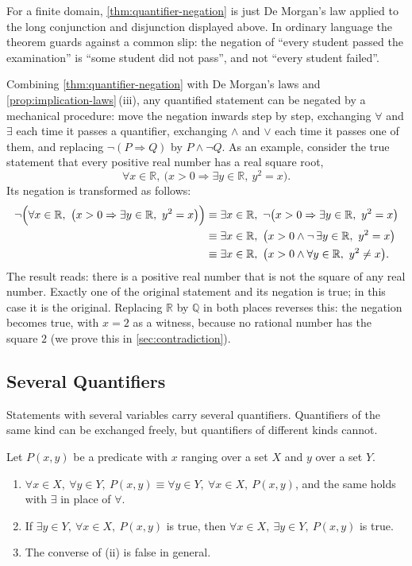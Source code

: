 For a finite domain, \cref{thm:quantifier-negation} is just De Morgan's law applied to the long conjunction and disjunction displayed above. In ordinary language the theorem guards against a common slip: the negation of ``every student passed the examination'' is ``some student did not pass'', and not ``every student failed''.

Combining \cref{thm:quantifier-negation} with De Morgan's laws and \cref{prop:implication-laws}\,(iii), any quantified statement can be negated by a mechanical procedure: move the negation inwards step by step, exchanging $\forall$ and $\exists$ each time it passes a quantifier, exchanging $\wedge$ and $\vee$ each time it passes one of them, and replacing $\neg(P\Rightarrow Q)$ by $P\wedge\neg Q$. As an example, consider the true statement that every positive real number has a real square root,
\[
\forall x\in\mathbb R,\ \bigl(x>0\Rightarrow\exists y\in\mathbb R,\ y^2=x\bigr).
\]
Its negation is transformed as follows:
\begin{align*}
\neg\Bigl(\forall x\in\mathbb R,\ \bigl(x>0\Rightarrow\exists y\in\mathbb R,\ y^2=x\bigr)\Bigr)
&\equiv\exists x\in\mathbb R,\ \neg\bigl(x>0\Rightarrow\exists y\in\mathbb R,\ y^2=x\bigr)\\
&\equiv\exists x\in\mathbb R,\ \bigl(x>0\wedge\neg\,\exists y\in\mathbb R,\ y^2=x\bigr)\\
&\equiv\exists x\in\mathbb R,\ \bigl(x>0\wedge\forall y\in\mathbb R,\ y^2\ne x\bigr).
\end{align*}
The result reads: there is a positive real number that is not the square of any real number. Exactly one of the original statement and its negation is true; in this case it is the original. Replacing $\mathbb R$ by $\mathbb Q$ in both places reverses this: the negation becomes true, with $x=2$ as a witness, because no rational number has the square $2$ (we prove this in \cref{sec:contradiction}).

\subsection{Several Quantifiers}

Statements with several variables carry several quantifiers. Quantifiers of the same kind can be exchanged freely, but quantifiers of different kinds cannot.

\begin{proposition}
\label{prop:quantifier-order}
Let $P(x,y)$ be a predicate with $x$ ranging over a set $X$ and $y$ over a set $Y$.
\begin{enumerate}
\item $\forall x\in X,\ \forall y\in Y,\ P(x,y)\equiv\forall y\in Y,\ \forall x\in X,\ P(x,y)$, and the same holds with $\exists$ in place of $\forall$.
\item If $\exists y\in Y,\ \forall x\in X,\ P(x,y)$ is true, then $\forall x\in X,\ \exists y\in Y,\ P(x,y)$ is true.
\item The converse of (ii) is false in general.
\end{enumerate}
\end{proposition}

